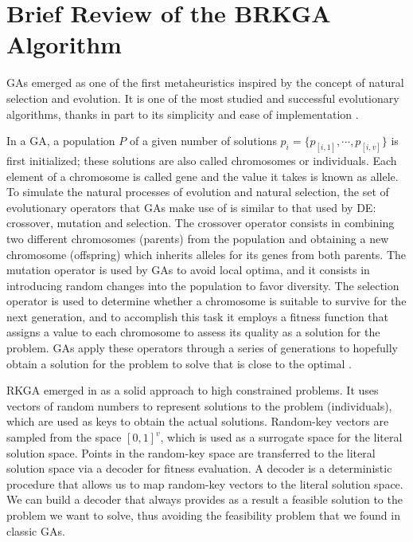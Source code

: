 \section{Brief Review of the BRKGA Algorithm} \label{sec:brkga}

\acp{GA} emerged as one of the first metaheuristics inspired by the concept of natural selection and evolution. It is one of the most studied and successful evolutionary algorithms, thanks in part to its simplicity and ease of implementation \cite{fausto2019ants, goldberg1989genetic}. 

In a \acs{GA}, a population $P$ of a given number of solutions \sloppy $p_i = \{p_{[i,1]}, \cdots, p_{[i,v]}\}$ is first initialized; these solutions are also called chromosomes or individuals. Each element of a chromosome is called gene and the value it takes is known as allele. To simulate the natural processes of evolution and natural selection, the set of evolutionary operators that \acsp{GA} make use of is similar to that used by \acs{DE}: crossover, mutation and selection. The crossover operator consists in combining two different chromosomes (parents) from the population and obtaining a new chromosome (offspring) which inherits alleles for its genes from both parents. The mutation operator is used by \acsp{GA} to avoid local optima, and it consists in introducing random changes into the population to favor diversity. The selection operator is used to determine whether a chromosome is suitable to survive for the next generation, and to accomplish this task it employs a fitness function that assigns a value to each chromosome to assess its quality as a solution for the problem. \acsp{GA} apply these operators through a series of generations to hopefully obtain a solution for the problem to solve that is close to the optimal \cite{fausto2019ants}.  

\acf{RKGA} emerged in \cite{bean1994genetic} as a solid approach to high constrained problems. It uses vectors of random numbers to represent solutions to the problem (individuals), which are used as keys to obtain the actual solutions. Random-key vectors are sampled from the space $[0,1]^{v}$, which is used as a surrogate space for the literal solution space. Points in the random-key space are transferred to the literal solution space via a decoder for fitness evaluation. A decoder is a deterministic procedure that allows us to map random-key vectors to the literal solution space. We can build a decoder that always provides as a result a feasible solution to the problem we want to solve, thus avoiding the feasibility problem that we found in classic \acsp{GA}.

